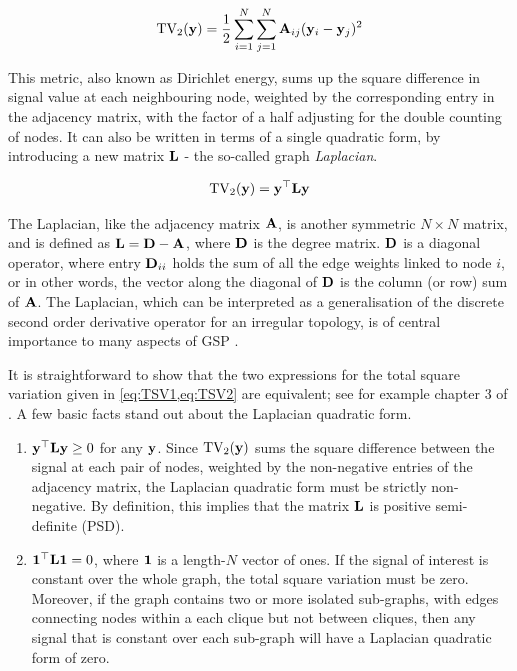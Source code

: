 \begin{equation}
    \label{eq:TSV1}
    \text{TV}_2(\mathbf{y}) = \frac{1}{2}\sum_{i=1}^N \sum_{j=1}^N \mathbf{A}_{ij} (\mathbf{y}_i - \mathbf{y}_j)^2
\end{equation}

This metric, also known as Dirichlet energy, sums up the square difference in signal value at each neighbouring node, weighted by the corresponding entry in the adjacency matrix, with the factor of a half adjusting for the double counting of nodes. It can also be written in terms of a single quadratic form, by introducing a new matrix $\mathbf{L}$ - the so-called graph \textit{Laplacian}. 

\begin{equation}
    \label{eq:TSV2}
    \text{TV}_2(\mathbf{y}) = \mathbf{y}^\top \mathbf{L} \mathbf{y}
\end{equation}

The Laplacian, like the adjacency matrix $\mathbf{A}$, is another symmetric $N \times N$ matrix, and is defined as $\mathbf{L} = \mathbf{D} - \mathbf{A}$, where $\mathbf{D}$ is the degree matrix. $\mathbf{D}$ is a diagonal operator, where entry $\mathbf{D}_{ii}$ holds the sum of all the edge weights linked to node $i$, or in other words, the vector along the diagonal of $\mathbf{D}$ is the column (or row) sum of $\mathbf{A}$. The Laplacian, which can be interpreted as a generalisation of the discrete second order derivative operator for an irregular topology, is of central importance to many aspects of GSP \citep{Shuman2013}. 

\newpage

It is straightforward to show that the two expressions for the total square variation given in \cref{eq:TSV1,eq:TSV2} are equivalent; see for example chapter 3 of \cite{Ortega2022}. A few basic facts stand out about the Laplacian quadratic form.

\begin{enumerate}
    \item $\mathbf{y}^\top \mathbf{L} \mathbf{y} \geq 0$ for any $\mathbf{y}$. Since $\text{TV}_2(\mathbf{y})$ sums the square difference between the signal at each pair of nodes, weighted by the non-negative entries of the adjacency matrix, the Laplacian quadratic form must be strictly non-negative. By definition, this implies that the matrix $\mathbf{L}$ is positive semi-definite (PSD). 
    \item $\mathbf{1}^\top \mathbf{L} \mathbf{1} = 0$, where $\mathbf{1}$ is a length-$N$ vector of ones. If the signal of interest is constant over the whole graph, the total square variation must be zero. Moreover, if the graph contains two or more isolated sub-graphs, with edges connecting nodes within a each clique but not between cliques, then any signal that is constant over each sub-graph will have a Laplacian quadratic form of zero. 
\end{enumerate}

